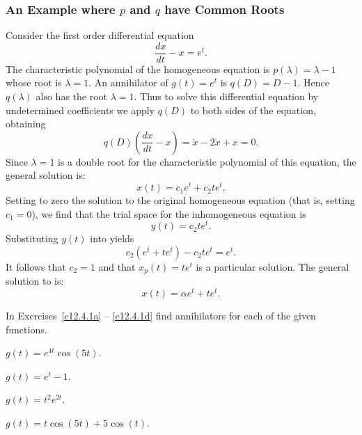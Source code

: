 \subsubsection*{An Example where $p$ and $q$ have Common Roots}

Consider the first order differential equation
\begin{equation}  \label{E:exer4}
\frac{dx}{dt} - x = e^t.
\end{equation}
The characteristic polynomial of the homogeneous equation is 
$p(\lambda)=\lambda-1$ whose root is $\lambda=1$.  An 
annihilator of 
$g(t)=e^t$ is $q(D)=D-1$.  Hence $q(\lambda)$ also has the root $\lambda=1$.
Thus to solve this differential equation by 
undetermined coefficients we
apply $q(D)$ to both sides of the equation, obtaining
\[
q(D) \left(\frac{dx}{dt} - x\right) = \ddot{x} -2\dot{x} +x =0.
\]
Since $\lambda=1$ is a double root for the characteristic polynomial of this 
equation, the general solution is:
\[
x(t) = c_1e^t + c_2te^t.
\]
Setting to zero the solution to the original homogeneous equation (that is, 
setting $c_1=0$), we find that the trial space
for the inhomogeneous equation 
 is
\[
y(t) = c_2te^t.
\] 
Substituting $y(t)$ into  yields
\[
c_2(e^t + te^t) - c_2te^t = e^t.
\] 
It follows that $c_2=1$ and that $x_p(t) = te^t$ is a particular solution. 
The general solution to  is:
\[
x(t) = \alpha e^t + te^t.
\]


\EXER

\TEXER

\noindent In Exercises~\ref{c12.4.1a} -- \ref{c12.4.1d} find annihilators 
for each of the given functions.
\begin{exercise}  \label{c12.4.1a}
$g(t) = e^{4t}\cos(5t)$.
\end{exercise}
\begin{exercise}  \label{c12.4.1b}
$g(t) = e^t-1$.
\end{exercise}
\begin{exercise}  \label{c12.4.1c}
$g(t) = t^2e^{2t}$.
\end{exercise}
\begin{exercise}  \label{c12.4.1d}
$g(t) = t\cos(5t)+5\cos(t)$.
\end{exercise}

